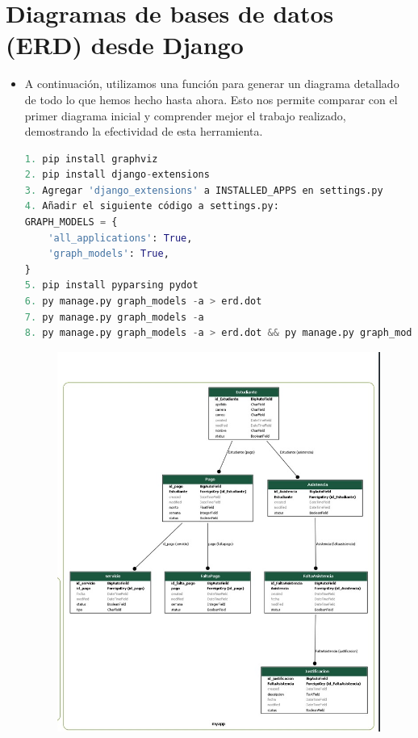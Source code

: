 \documentclass{article}
\begin{document}
     \section{Diagramas de bases de datos (ERD) desde Django}

\begin{itemize}
    \item A continuación, utilizamos una función para generar un diagrama detallado de todo lo que hemos hecho hasta ahora. Esto nos permite comparar con el primer diagrama inicial y comprender mejor el trabajo realizado, demostrando la efectividad de esta herramienta.

    \begin{lstlisting}[language=Python, caption={Comandos para la instalación y uso de Graphviz}]
1. pip install graphviz
2. pip install django-extensions
3. Agregar 'django_extensions' a INSTALLED_APPS en settings.py
4. Añadir el siguiente código a settings.py:
GRAPH_MODELS = {
    'all_applications': True,
    'graph_models': True,
}
5. pip install pyparsing pydot
6. py manage.py graph_models -a > erd.dot
7. py manage.py graph_models -a
8. py manage.py graph_models -a > erd.dot && py manage.py graph_models --pydot -a -g -o erd.png
    \end{lstlisting}

    \begin{figure}[H]
        \centering
        \includegraphics[scale=0.5]{img/diargamaER_FINAL.jpeg}
    \end{figure}
\end{itemize}
\end{document}
